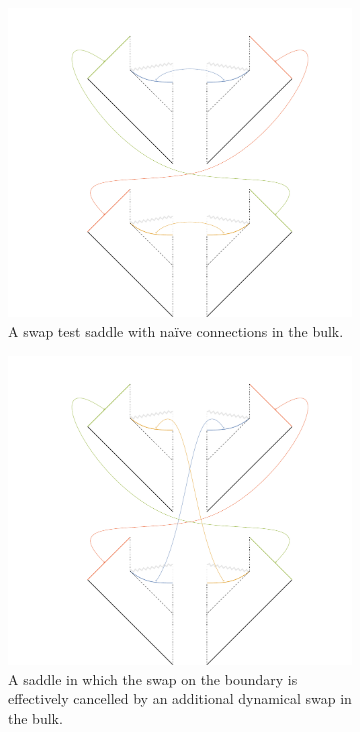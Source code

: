 \documentclass[letterpaper,12pt]{article}
\begin{document}
\begin{figure}
\centering
\begin{subfigure}[t]{.48\textwidth}\centering
	\includegraphics[width=.9\textwidth]{PSswap1}
	\caption{A swap test saddle with na\"ive connections in the bulk.}
\label{fig:PSswapa}
\end{subfigure}
\hfill
\begin{subfigure}[t]{.48\textwidth}\centering
	\includegraphics[width=.9\textwidth]{PSswap2}
		\caption{A saddle in which the swap on the boundary is effectively cancelled by an additional dynamical swap in the bulk.}
\label{fig:PSswapb}
\end{subfigure}
\caption{\label{fig:PSswap}}
\end{figure}
\end{document}

